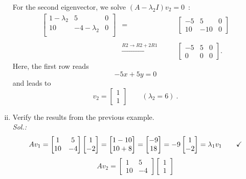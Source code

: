 \begin{example}
\begin{enumerate}[(i)]
		For the second eigenvector, we solve $(A-\lambda_2 I)v_2=0$~:
		\[\begin{array}{ccc}
		\left[\begin{array}{cc|c}
		1-\lambda_2 & 5 & 0 \\
		10 & -4-\lambda_2& 0 \\
		\end{array}\right] & = \qquad & \left[\begin{array}{cc|c}
		-5 & 5 & 0 \\
		10 & -10 & 0 
		\end{array}\right] \\ & & \\
		& \stackrel{R2 \rightarrow R2 + 2 R1}{\rightarrow} \qquad & 
		\left[\begin{array}{cc|c}
		-5 & 5 & 0 \\
		0 &  0 & 0 
		\end{array}\right].
		\end{array}	\]
		Here, the first row reads
		\[ -5 x + 5 y = 0 \]
		and leads to
		\[v_2 = \begin{bmatrix}
		1 \\ 1
		\end{bmatrix} \qquad (\lambda_2 = 6) \:. \]
	\item Verify the results from the previous example.\\
		{\it Sol.:}
		\[ Av_1 = \begin{bmatrix}
		1 & 5 \\ 10 & -4 
		\end{bmatrix} \begin{bmatrix}
		1 \\ -2
		\end{bmatrix} = \begin{bmatrix}
		1-10 \\ 10 + 8
		\end{bmatrix} = \begin{bmatrix}
		-9 \\ 18
		\end{bmatrix} = -9 \begin{bmatrix}
		1 \\ -2
		\end{bmatrix} = \lambda_1 v_1
		\qquad \text{\checkmark} \]
		\[ Av_2 = \begin{bmatrix}
		1 & 5 \\ 10 & -4 
		\end{bmatrix} \begin{bmatrix}
		1 \\ 1

\end{bmatrix}\]
\end{enumerate}
\end{example}
